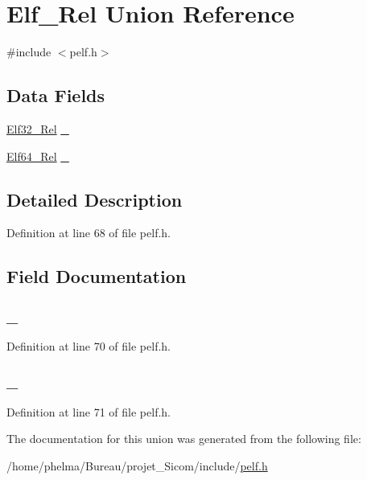 \hypertarget{union_elf___rel}{\section{Elf\-\_\-\-Rel Union Reference}
\label{union_elf___rel}
}


{\ttfamily \#include $<$pelf.\-h$>$}

\subsection*{Data Fields}
\begin{DoxyCompactItemize}
\item 
\hyperlink{struct_elf32___rel}{Elf32\-\_\-\-Rel} \hyperlink{union_elf___rel_a06063944229fe89bb45981113901ebc4}{\-\_}
\item 
\hyperlink{struct_elf64___rel}{Elf64\-\_\-\-Rel} \hyperlink{union_elf___rel_acfa4d873dacf23e803f98929f771325d}{\-\_}
\end{DoxyCompactItemize}


\subsection{Detailed Description}


Definition at line 68 of file pelf.\-h.



\subsection{Field Documentation}
\hypertarget{union_elf___rel_a06063944229fe89bb45981113901ebc4}{
\subsubsection[{\-\_\-32}]{ \-\_}}\label{union_elf___rel_a06063944229fe89bb45981113901ebc4}


Definition at line 70 of file pelf.\-h.

\hypertarget{union_elf___rel_acfa4d873dacf23e803f98929f771325d}{
\subsubsection[{\-\_\-64}]{ \-\_}}\label{union_elf___rel_acfa4d873dacf23e803f98929f771325d}


Definition at line 71 of file pelf.\-h.



The documentation for this union was generated from the following file\-:\begin{DoxyCompactItemize}
\item 
/home/phelma/\-Bureau/projet\-\_\-\-Sicom/include/\hyperlink{pelf_8h}{pelf.\-h}\end{DoxyCompactItemize}
